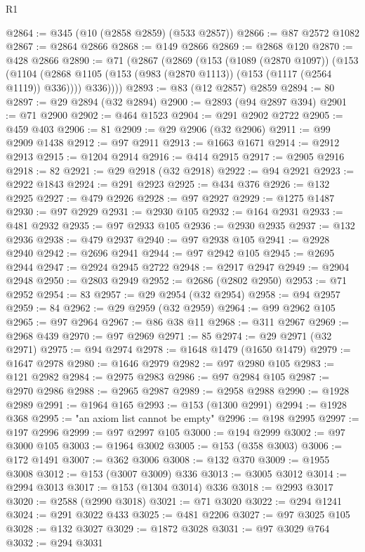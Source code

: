 \begin{lexlean}{R1}
\begin{coremodule}
{{{{{{{{{{{{{{{{{{{{{{{{{{{{{{{{{{{{{{{{{{{{{{{{{{{{{{{{{{{{{{{{{{{{{{{{{{{{{{{{{{{{{{{{{{{{{{{{{{{{{{{{{{{{{{{{{{{{{{{{{{{{{{{{{{{{{{{{{{{{{{{{{{{{{{{{{{{{{{{{{{{{{{{{{{{{{{{{{{{{{{{{{{@2864 := @345 (@10 (@2858 @2859) (@533 @2857))
@2866 := @87 @2572 @1082
@2867 := @2864 @2866
@2868 := @149 @2866
@2869 := @2868 @120
@2870 := @428 @2866
@2890 := @71
    (@2867
      (@2869
        (@153
          (@1089 (@2870 @1097))
          (@153
            (@1104 (@2868 @1105 (@153 (@983 (@2870 @1113)) (@153 (@1117 (@2564 @1119)) @336))))
            @336))))
@2893 := @83 (@12 @2857) @2859
@2894 := 80
@2897 := @29 @2894 (@32 @2894)
@2900 := @2893 (@94 @2897 @394)
@2901 := @71 @2900
@2902 := @464 @1523
@2904 := @291 @2902 @2722
@2905 := @459 @403
@2906 := 81
@2909 := @29 @2906 (@32 @2906)
@2911 := @99 @2909 @1438
@2912 := @97 @2911
@2913 := @1663 @1671
@2914 := @2912 @2913
@2915 := @1204 @2914
@2916 := @414 @2915
@2917 := @2905 @2916
@2918 := 82
@2921 := @29 @2918 (@32 @2918)
@2922 := @94 @2921
@2923 := @2922 @1843
@2924 := @291 @2923
@2925 := @434 @376
@2926 := @132 @2925
@2927 := @479 @2926
@2928 := @97 @2927
@2929 := @1275 @1487
@2930 := @97 @2929
@2931 := @2930 @105
@2932 := @164 @2931
@2933 := @481 @2932
@2935 := @97 @2933 @105
@2936 := @2930 @2935
@2937 := @132 @2936
@2938 := @479 @2937
@2940 := @97 @2938 @105
@2941 := @2928 @2940
@2942 := @2696 @2941
@2944 := @97 @2942 @105
@2945 := @2695 @2944
@2947 := @2924 @2945 @2722
@2948 := @2917 @2947
@2949 := @2904 @2948
@2950 := @2803 @2949
@2952 := @2686 (@2802 @2950)
@2953 := @71 @2952
@2954 := 83
@2957 := @29 @2954 (@32 @2954)
@2958 := @94 @2957
@2959 := 84
@2962 := @29 @2959 (@32 @2959)
@2964 := @99 @2962 @105
@2965 := @97 @2964
@2967 := @86 @38 @11
@2968 := @311 @2967
@2969 := @2968 @439
@2970 := @97 @2969
@2971 := 85
@2974 := @29 @2971 (@32 @2971)
@2975 := @94 @2974
@2978 := @1648 @1479 (@1650 @1479)
@2979 := @1647 @2978
@2980 := @1646 @2979
@2982 := @97 @2980 @105
@2983 := @121 @2982
@2984 := @2975 @2983
@2986 := @97 @2984 @105
@2987 := @2970 @2986
@2988 := @2965 @2987
@2989 := @2958 @2988
@2990 := @1928 @2989
@2991 := @1964 @165
@2993 := @153 (@1300 @2991)
@2994 := @1928 @368
@2995 := "an axiom list cannot be empty"
@2996 := @198 @2995
@2997 := @197 @2996
@2999 := @97 @2997 @105
@3000 := @194 @2999
@3002 := @97 @3000 @105
@3003 := @1964 @3002
@3005 := @153 (@358 @3003)
@3006 := @172 @1491
@3007 := @362 @3006
@3008 := @132 @370
@3009 := @1955 @3008
@3012 := @153 (@3007 @3009) @336
@3013 := @3005 @3012
@3014 := @2994 @3013
@3017 := @153 (@1304 @3014) @336
@3018 := @2993 @3017
@3020 := @2588 (@2990 @3018)
@3021 := @71 @3020
@3022 := @294 @1241
@3024 := @291 @3022 @433
@3025 := @481 @2206
@3027 := @97 @3025 @105
@3028 := @132 @3027
@3029 := @1872 @3028
@3031 := @97 @3029 @764
@3032 := @294 @3031
}}}}}}}}}}}}}}}}}}}}}}}}}}}}}}}}}}}}}}}}}}}}}}}}}}}}}}}}}}}}}}}}}}}}}}}}}}}}}}}}}}}}}}}}}}}}}}}}}}}}}}}}}}}}}}}}}}}}}}}}}}}}}}}}}}}}}}}}}}}}}}}}}}}}}}}}}}}}}}}}}}}}}}}}}}}}}}}}}}}}}}}}}}
\end{coremodule}
\end{lexlean}
